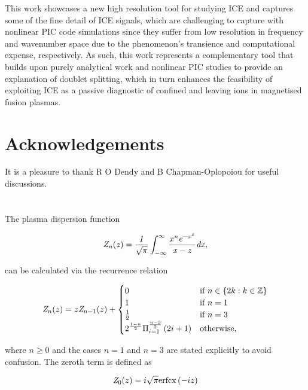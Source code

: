 \documentclass[12pt]{iopart}
\begin{document}
This work showcases a new high resolution tool for studying ICE and captures
some of the fine detail of ICE signals, which are challenging to capture
with nonlinear PIC
code simulations since they suffer from low resolution in frequency and
wavenumber space due to the phenomenon's transience and computational expense,
respectively. As such, this work represents a complementary tool that builds
upon purely analytical work and nonlinear PIC studies to provide
an explanation of doublet splitting, which in turn enhances
the feasibility of exploiting ICE as a passive diagnostic of confined and
leaving ions in magnetised fusion plasmas.

\section{Acknowledgements}

It is a pleasure to thank R O Dendy and B Chapman-Oplopoiou for useful
discussions.

\appendix

\section{}

The plasma dispersion function \cite{Fried1961}

\begin{equation}
\it{Z}_n(z)=\frac{1}{\sqrt{\pi}}\int_{-\infty}^{\infty}\frac{x^n e^{-x^2}}{x-z}dx,
\end{equation}

\noindent can be calculated via the recurrence relation \cite{Sampoorna2007}

\begin{equation}
{\it Z}_n(z) = z {\it Z}_{n-1}(z) + \begin{cases}
0 & \text{if } n \in \{2k : k \in \mathbb{Z}\}
\\
1 & \text{if } n = 1
\\
\frac{1}{2} & \text{if } n = 3
\\
2^{\frac{1-n}{2}} \Pi_{i=1}^{\frac{n-3}{2}} \left( 2i + 1 \right) & \text{otherwise},
\end{cases}
\end{equation}

\noindent where $n \geq 0$ and the cases $n=1$ and $n=3$ are stated explicitly to avoid confusion. The zeroth term is defined as

\begin{equation}
 {\it Z}_0(z) = i \sqrt{\pi} \mathrm{erfcx} \left(-i z \right)
\end{equation}
\end{document}
